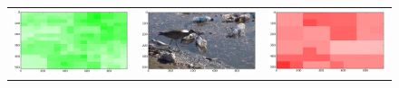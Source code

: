 \begin{figure}
\begin{tabular}{ccc}
\includegraphics[keepaspectratio=true,width=\segwidth]{images/segment/701_11__animals__.png} &
\includegraphics[keepaspectratio=true,width=\segwidth]{images/segment/701_11__image__.png} &
\includegraphics[keepaspectratio=true,width=\segwidth]{images/segment/701_11__plastic__.png} \\


\end{tabular}
\end{figure}
